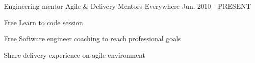 

\begin{cventries}

  \cventry
    {Engineering mentor} %
    {Agile \& Delivery Mentors} %
    {Everywhere} %
    {Jun. 2010 - PRESENT} %
    {
      \begin{cvitems} %
        \item {Free Learn to code session}
        \item {Free Software engineer coaching to reach professional goals}
        \item {Share delivery experience on  agile environment}
      \end{cvitems}
    }
    { } %


\end{cventries}
